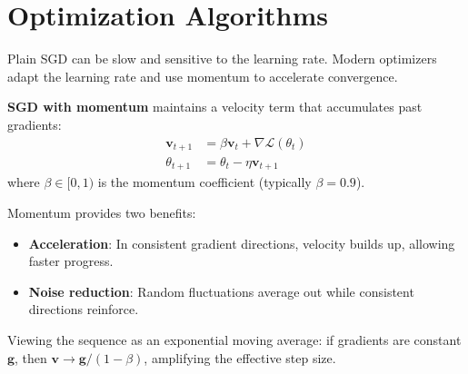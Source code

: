 \section{Optimization Algorithms}

Plain SGD can be slow and sensitive to the learning rate. Modern optimizers adapt the learning rate and use momentum to accelerate convergence.

\begin{definition}[Momentum]
    \textbf{SGD with momentum} maintains a velocity term that accumulates past gradients:
    \begin{align}
        \mathbf{v}_{t+1} &= \beta \mathbf{v}_t + \nabla \mathcal{L}(\theta_t) \\
        \theta_{t+1} &= \theta_t - \eta \mathbf{v}_{t+1}
    \end{align}
    where $\beta \in [0,1)$ is the momentum coefficient (typically $\beta = 0.9$).
\end{definition}

\begin{remark}
    Momentum provides two benefits:
    \begin{itemize}
        \item \textbf{Acceleration}: In consistent gradient directions, velocity builds up, allowing faster progress.
        \item \textbf{Noise reduction}: Random fluctuations average out while consistent directions reinforce.
    \end{itemize}

    Viewing the sequence as an exponential moving average: if gradients are constant $\mathbf{g}$, then $\mathbf{v} \to \mathbf{g}/(1-\beta)$, amplifying the effective step size.
\end{remark}


